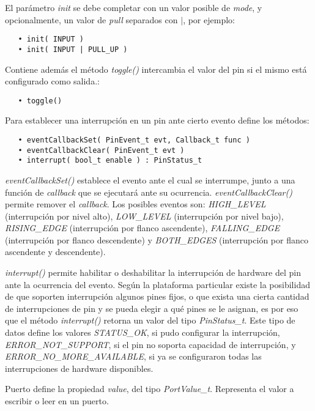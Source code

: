 El parámetro \emph{init} se debe completar con un valor posible de \emph{mode}, y opcionalmente, un valor de \emph{pull} separados con $|$, por ejemplo:

\begin{verbatim}
   • init( INPUT )
   • init( INPUT | PULL_UP )
\end{verbatim}

Contiene además el método \emph{toggle()} intercambia el valor del pin si el mismo está configurado como salida.:

\begin{verbatim}
   • toggle()
\end{verbatim}

Para establecer una interrupción en un pin ante cierto evento define los métodos: 

\begin{verbatim}
   • eventCallbackSet( PinEvent_t evt, Callback_t func )
   • eventCallbackClear( PinEvent_t evt )
   • interrupt( bool_t enable ) : PinStatus_t
 \end{verbatim} 

\emph{eventCallbackSet()} establece el evento ante el cual se interrumpe, junto a una función de \emph{callback} que se ejecutará ante su ocurrencia. \emph{eventCallbackClear()} permite remover el \emph{callback}. Los posibles eventos son: \emph{HIGH\_LEVEL} (interrupción por nivel alto), \emph{LOW\_LEVEL} (interrupción por nivel bajo), \emph{RISING\_EDGE} (interrupción por flanco ascendente), \emph{FALLING\_EDGE} (interrupción por flanco descendente) y \emph{BOTH\_EDGES} (interrupción por flanco ascendente y descendente). 

\emph{interrupt()} permite habilitar o deshabilitar la interrupción de hardware del pin ante la ocurrencia del evento. Según la plataforma particular existe la posibilidad de que soporten interrupción algunos pines fijos, o que exista una cierta cantidad de interrupciones de pin y se pueda elegir a qué pines se le asignan, es por eso que el método \emph{interrupt()} retorna un valor del tipo \emph{PinStatus\_t}. Este tipo de datos define los valores \emph{STATUS\_OK}, si pudo configurar la interrupción, \emph{ERROR\_NOT\_SUPPORT}, si el pin no soporta capacidad de interrupción, y \emph{ERROR\_NO\_MORE\_AVAILABLE}, si ya se configuraron todas las interrupciones de hardware disponibles. 


Puerto define la propiedad \emph{value}, del tipo \emph{PortValue\_t}. Representa el valor a escribir o leer en un puerto.

